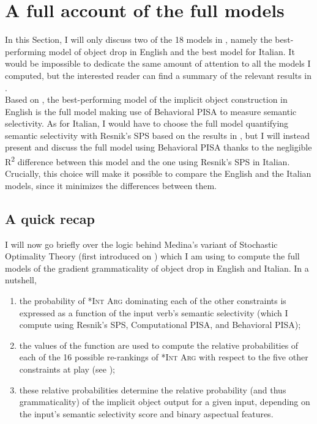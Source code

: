 \section{A full account of the full models} 
In this Section, I will only discuss two of the 18 models in , namely the best-performing model of object drop in English and the best model for Italian. It would be impossible to dedicate the same amount of attention to all the models I computed, but the interested reader can find a summary of the relevant results in .\\
Based on , the best-performing model of the implicit object construction in English is the full model making use of Behavioral PISA to measure semantic selectivity. As for Italian, I would have to choose the full model quantifying semantic selectivity with Resnik's SPS based on the results in , but I will instead present and discuss the full model using Behavioral PISA thanks to the negligible R\textsuperscript{2} difference between this model and the one using Resnik's SPS in Italian. Crucially, this choice will make it possible to compare the English and the Italian models, since it minimizes the differences between them.


\subsection{A quick recap} 

I will now go briefly over the logic behind Medina's variant of Stochastic Optimality Theory (first introduced on ) which I am using to compute the full models of the gradient grammaticality of object drop in English and Italian. In a nutshell,

\begin{enumerate}
    \item the probability of \textsc{*Int Arg} dominating each of the other constraints is expressed as a function of the input verb's semantic selectivity (which I compute using Resnik's SPS, Computational PISA, and Behavioral PISA);
    \item the values of the function are used to compute the relative probabilities of each of the 16 possible re-rankings of \textsc{*Int Arg} with respect to the five other constraints at play (see );
    \item these relative probabilities determine the relative probability (and thus grammaticality) of the implicit object output for a given input, depending on the input's semantic selectivity score and binary aspectual features.
\end{enumerate}

